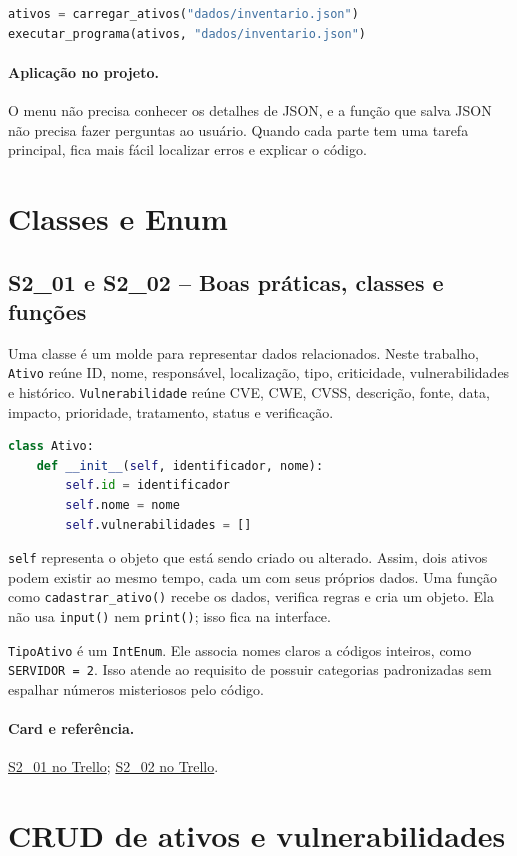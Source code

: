 \documentclass[11pt,a4paper]{article}
\newcommand{\projeto}{\paragraph{Aplicação no projeto.}}
\newcommand{\referencia}[2]{\paragraph{Card e referência.}\href{#1}{#2}}
\newcommand{\cardsection}[1]{\Needspace{12\baselineskip}\subsection{#1}}
\begin{document}
\begin{lstlisting}[language=Python,caption={Fluxo principal simplificado}]
ativos = carregar_ativos("dados/inventario.json")
executar_programa(ativos, "dados/inventario.json")
\end{lstlisting}

\projeto
O menu não precisa conhecer os detalhes de JSON, e a função que salva JSON não precisa fazer perguntas ao usuário. Quando cada parte tem uma tarefa principal, fica mais fácil localizar erros e explicar o código.

\section{Classes e Enum}

\cardsection{S2\_01 e S2\_02 -- Boas práticas, classes e funções}

Uma classe é um molde para representar dados relacionados. Neste trabalho, \texttt{Ativo} reúne ID, nome, responsável, localização, tipo, criticidade, vulnerabilidades e histórico. \texttt{Vulnerabilidade} reúne CVE, CWE, CVSS, descrição, fonte, data, impacto, prioridade, tratamento, status e verificação.

\begin{lstlisting}[language=Python,caption={Ideia de uma classe simples}]
class Ativo:
    def __init__(self, identificador, nome):
        self.id = identificador
        self.nome = nome
        self.vulnerabilidades = []
\end{lstlisting}

\texttt{self} representa o objeto que está sendo criado ou alterado. Assim, dois ativos podem existir ao mesmo tempo, cada um com seus próprios dados. Uma função como \texttt{cadastrar\_ativo()} recebe os dados, verifica regras e cria um objeto. Ela não usa \texttt{input()} nem \texttt{print()}; isso fica na interface.

\texttt{TipoAtivo} é um \texttt{IntEnum}. Ele associa nomes claros a códigos inteiros, como \texttt{SERVIDOR = 2}. Isso atende ao requisito de possuir categorias padronizadas sem espalhar números misteriosos pelo código.

\referencia{https://trello.com/c/ALQSY6p9}{S2\_01 no Trello}; \href{https://trello.com/c/hu3YSI6L}{S2\_02 no Trello}.

\section{CRUD de ativos e vulnerabilidades}
\end{document}
